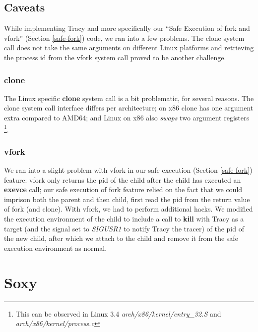 \documentclass[a4paper, 10pt]{report}
\begin{document}
\section{Caveats}

While implementing Tracy and more specifically our ``Safe Execution of fork
and vfork'' (Section \ref{safe-fork}) code, we ran into a few problems. The
clone system call does not take the same arguments on different Linux
platforms and retrieving the process id from the vfork system call proved to be
another challenge.

\subsection{clone}

The Linux specific \textbf{clone} system call is a bit problematic, for
several reasons. The clone system call interface differs per architecture;
on x86 clone has one argument extra compared to AMD64; and Linux on x86
also \textit{swaps} two argument registers
\footnote{This can be observed in Linux 3.4 \textit{arch/x86/kernel/entry\_32.S}
and \textit{arch/x86/kernel/process.c}}.


\subsection{vfork}

We ran into a slight problem with vfork in our safe execution (Section
\ref{safe-fork}) feature: vfork only returns the pid of the child after the
child has executed an \textbf{exevce} call; our safe execution of fork feature
relied on the fact that we could imprison both the parent and then child, first
read the pid from the return value of fork (and clone). With vfork, we had to
perform additional hacks. We modified the execution environment of the child
to include a call to \textbf{kill} with Tracy as a target (and the signal set to
\textit{SIGUSR1} to notify Tracy the tracer) of the pid of the new child,
after which we attach to the child and remove it from the safe execution
environment as normal.

\chapter{Soxy}
\end{document}
